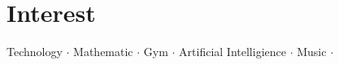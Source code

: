 \section{Interest}

Technology $\cdot$ Mathematic $\cdot$ Gym $\cdot$ Artificial Intelligience $\cdot$ Music $\cdot$ 